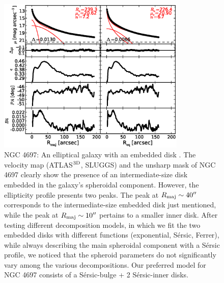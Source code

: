 \documentclass[preprint2]{emulateapj}
\newcommand{\fitfigurewidth}{0.8\textwidth}
\begin{document}
  \begin{figure}[h]
  \begin{center}
  \includegraphics[width=\fitfigurewidth]{n4697_1Dfit.eps}
  \caption{NGC 4697: 
  An elliptical galaxy with an embedded disk \citep{scorzabender1995}.
  The velocity map (ATLAS$^{\rm 3D}$, SLUGGS) and the unsharp mask of NGC 4697 clearly show 
  the presence of an intermediate-size disk embedded in the galaxy's spheroidal component.
  However, the ellipticity profile presents two peaks. 
  The peak at $R_{\rm maj} \sim 40''$ corresponds to the intermediate-size embedded disk just mentioned,
  while the peak at $R_{\rm maj} \sim 10''$ pertains to a smaller inner disk.
  After testing different decomposition models, 
  in which we fit the two embedded disks with different functions (exponential, S\'ersic, Ferrer),
  while always describing the main spheroidal component with a S\'ersic profile,
  we noticed that the spheroid parameters do not significantly vary among the various decompositions.
  Our preferred model for NGC 4697 consists of a S\'ersic-bulge + 2 S\'ersic-inner disks.
  }
  \end{center}
  \end{figure}
\end{document}
